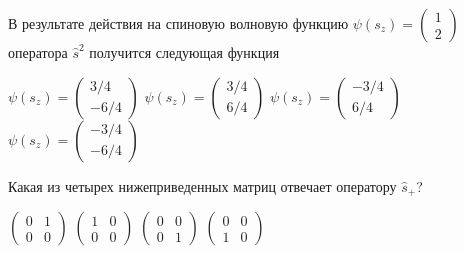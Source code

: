 \documentclass[11pt,a4paper]{exam}
\begin{document}
\begin{questions}
\question В результате действия на спиновую волновую функцию $\psi ({s_z}) = \left( {\begin{array}{*{20}{c}}
1\\
2
\end{array}} \right)$ оператора ${\hat s^2}$ получится следующая функция
\begin{choices}
\choice $\psi ({s_z}) = \left( {\begin{array}{*{20}{c}}
{3/4}\\
{ - 6/4}
\end{array}} \right)$   
\choice $\psi ({s_z}) = \left( {\begin{array}{*{20}{c}}
{3/4}\\
{6/4}
\end{array}} \right)$   
\choice $\psi ({s_z}) = \left( {\begin{array}{*{20}{c}}
{ - 3/4}\\
{6/4}
\end{array}} \right)$   
\choice $\psi ({s_z}) = \left( {\begin{array}{*{20}{c}}
{ - 3/4}\\
{ - 6/4}
\end{array}} \right)$
\end{choices}

\question Какая из четырех нижеприведенных матриц отвечает оператору ${\hat s_ + }$?
\begin{choices}
\choice $\left( {\begin{array}{*{20}{c}}
0&1\\
0&0
\end{array}} \right)$   
\choice $\left( {\begin{array}{*{20}{c}}
1&0\\
0&0
\end{array}} \right)$   
\choice $\left( {\begin{array}{*{20}{c}}
0&0\\
0&1
\end{array}} \right)$   
\choice $\left( {\begin{array}{*{20}{c}}
0&0\\
1&0
\end{array}} \right)$
\end{choices}


\end{questions}
\end{document}
